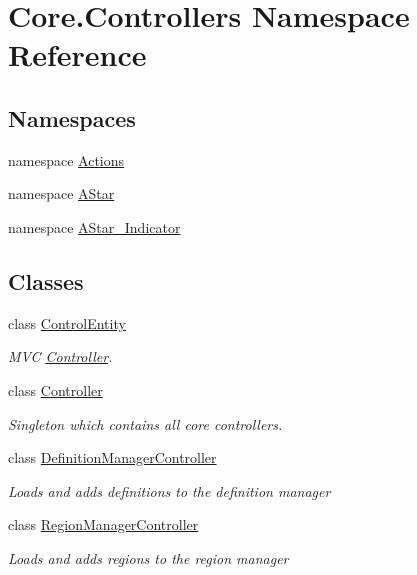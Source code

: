 \hypertarget{namespaceCore_1_1Controllers}{}\section{Core.\+Controllers Namespace Reference}
\label{namespaceCore_1_1Controllers}
\subsection*{Namespaces}
\begin{DoxyCompactItemize}
\item 
namespace \hyperlink{namespaceCore_1_1Controllers_1_1Actions}{Actions}
\item 
namespace \hyperlink{namespaceCore_1_1Controllers_1_1AStar}{A\+Star}
\item 
namespace \hyperlink{namespaceCore_1_1Controllers_1_1AStar__Indicator}{A\+Star\+\_\+\+Indicator}
\end{DoxyCompactItemize}
\subsection*{Classes}
\begin{DoxyCompactItemize}
\item 
class \hyperlink{classCore_1_1Controllers_1_1ControlEntity}{Control\+Entity}
\begin{DoxyCompactList}\small\item\em M\+V\+C \hyperlink{classCore_1_1Controllers_1_1Controller}{Controller}. \end{DoxyCompactList}\item 
class \hyperlink{classCore_1_1Controllers_1_1Controller}{Controller}
\begin{DoxyCompactList}\small\item\em Singleton which contains all core controllers. \end{DoxyCompactList}\item 
class \hyperlink{classCore_1_1Controllers_1_1DefinitionManagerController}{Definition\+Manager\+Controller}
\begin{DoxyCompactList}\small\item\em Loads and adds definitions to the definition manager \end{DoxyCompactList}\item 
class \hyperlink{classCore_1_1Controllers_1_1RegionManagerController}{Region\+Manager\+Controller}
\begin{DoxyCompactList}\small\item\em Loads and adds regions to the region manager \end{DoxyCompactList}\end{DoxyCompactItemize}
